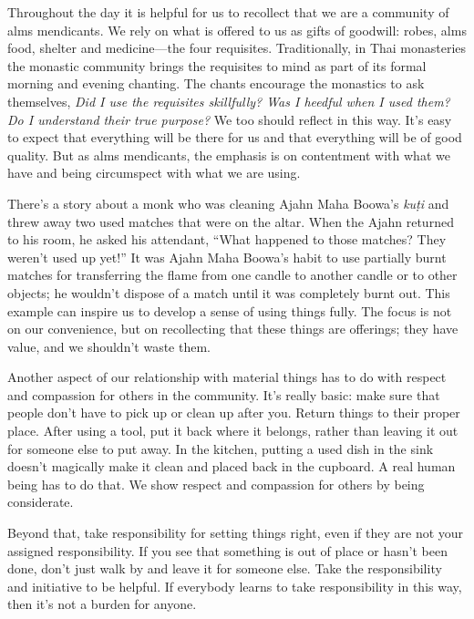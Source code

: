 
Throughout the day it is helpful for us to recollect that we are a 
community of alms mendicants. We rely on what is offered to us as gifts 
of goodwill: robes, alms food, shelter and medicine---the four 
requisites. Traditionally, in Thai monasteries the monastic community 
brings the requisites to mind as part of its formal morning and evening 
chanting. The chants encourage the monastics to ask themselves, 
\emph{Did I use the requisites skillfully? Was I heedful when I used 
them? Do I understand their true purpose?} We too should reflect in 
this way. It's easy to expect that everything will be there for us and 
that everything will be of good quality. But as alms mendicants, the 
emphasis is on contentment with what we have and being circumspect with 
what we are using.

There's a story about a monk who was cleaning Ajahn Maha Boowa's 
\emph{kuṭi} and threw away two used matches that were on the altar. 
When the Ajahn returned to his room, he asked his attendant, ``What 
happened to those matches? They weren't used up yet!'' It was Ajahn 
Maha Boowa's habit to use partially burnt matches for transferring the 
flame from one candle to another candle or to other objects; he 
wouldn't dispose of a match until it was completely burnt out. This 
example can inspire us to develop a sense of using things fully. The 
focus is not on our convenience, but on recollecting that these things 
are offerings; they have value, and we shouldn't waste them.

Another aspect of our relationship with material things has to do with 
respect and compassion for others in the community. It's really basic: 
make sure that people don't have to pick up or clean up after you. 
Return things to their proper place. After using a tool, put it back 
where it belongs, rather than leaving it out for someone else to put 
away. In the kitchen, putting a used dish in the sink doesn't magically 
make it clean and placed back in the cupboard. A real human being has 
to do that. We show respect and compassion for others by being 
considerate.

Beyond that, take responsibility for setting things right, even if they 
are not your assigned responsibility. If you see that something is out 
of place or hasn't been done, don't just walk by and leave it for 
someone else. Take the responsibility and initiative to be helpful. If 
everybody learns to take responsibility in this way, then it's not a 
burden for anyone.

